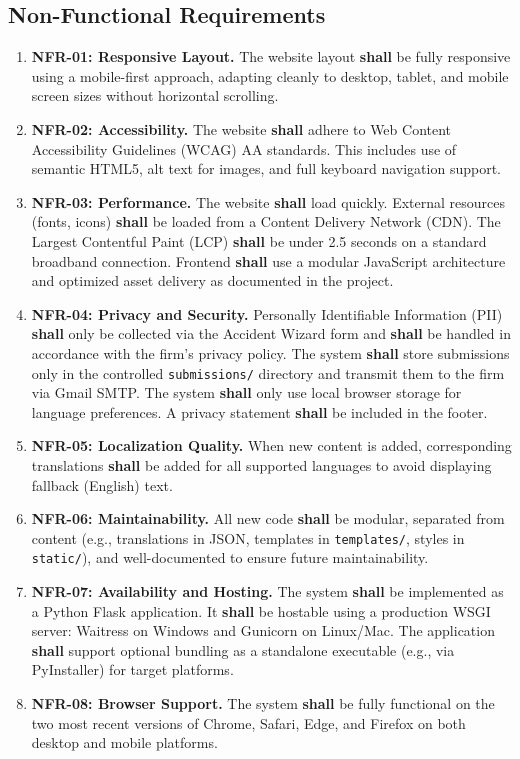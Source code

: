 \documentclass{article}
\begin{document}
\subsection{Non-Functional Requirements}
\begin{enumerate}
  \item \textbf{NFR-01: Responsive Layout.} The website layout \textbf{shall} be fully responsive using a mobile-first approach, adapting cleanly to desktop, tablet, and mobile screen sizes without horizontal scrolling.
  \item \textbf{NFR-02: Accessibility.} The website \textbf{shall} adhere to Web Content Accessibility Guidelines (WCAG) AA standards. This includes use of semantic HTML5, alt text for images, and full keyboard navigation support.
  \item \textbf{NFR-03: Performance.} The website \textbf{shall} load quickly. External resources (fonts, icons) \textbf{shall} be loaded from a Content Delivery Network (CDN). The Largest Contentful Paint (LCP) \textbf{shall} be under 2.5 seconds on a standard broadband connection. Frontend \textbf{shall} use a modular JavaScript architecture and optimized asset delivery as documented in the project.
  \item \textbf{NFR-04: Privacy and Security.} Personally Identifiable Information (PII) \textbf{shall} only be collected via the Accident Wizard form and \textbf{shall} be handled in accordance with the firm's privacy policy. The system \textbf{shall} store submissions only in the controlled \texttt{submissions/} directory and transmit them to the firm via Gmail SMTP. The system \textbf{shall} only use local browser storage for language preferences. A privacy statement \textbf{shall} be included in the footer.
  \item \textbf{NFR-05: Localization Quality.} When new content is added, corresponding translations \textbf{shall} be added for all supported languages to avoid displaying fallback (English) text.
  \item \textbf{NFR-06: Maintainability.} All new code \textbf{shall} be modular, separated from content (e.g., translations in JSON, templates in \texttt{templates/}, styles in \texttt{static/}), and well-documented to ensure future maintainability.
  \item \textbf{NFR-07: Availability and Hosting.} The system \textbf{shall} be implemented as a Python Flask application. It \textbf{shall} be hostable using a production WSGI server: Waitress on Windows and Gunicorn on Linux/Mac. The application \textbf{shall} support optional bundling as a standalone executable (e.g., via PyInstaller) for target platforms.
  \item \textbf{NFR-08: Browser Support.} The system \textbf{shall} be fully functional on the two most recent versions of Chrome, Safari, Edge, and Firefox on both desktop and mobile platforms.
\end{enumerate}
\end{document}
